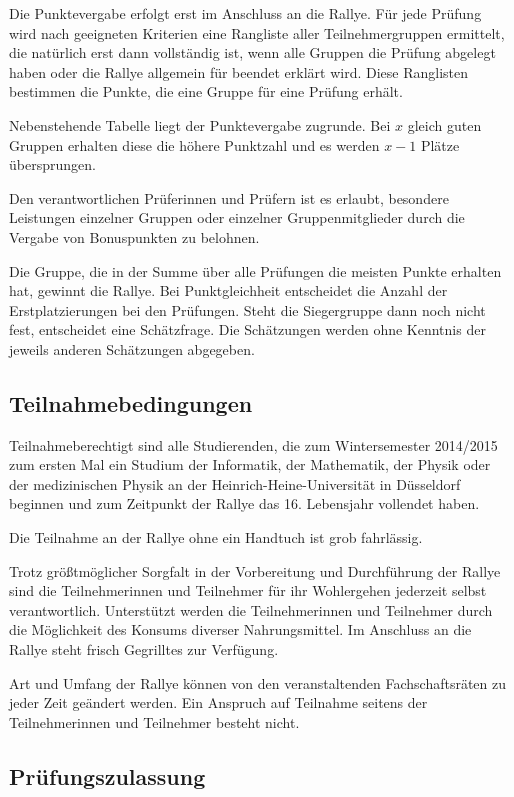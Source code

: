\documentclass[a4paper,10pt]{article}
\begin{document}
Die Punktevergabe erfolgt erst im Anschluss an die Rallye. Für jede
Prüfung wird nach geeigneten Kriterien eine Rangliste aller
Teilnehmergruppen ermittelt, die natürlich erst dann vollständig ist,
wenn alle Gruppen die Prüfung abgelegt haben oder die Rallye allgemein
für beendet erklärt wird. Diese Ranglisten bestimmen die Punkte, die
eine Gruppe für eine Prüfung erhält.

Nebenstehende Tabelle liegt der Punktevergabe zugrunde. Bei $x$ gleich
guten Gruppen erhalten diese die höhere Punktzahl und es werden $x-1$ Plätze
übersprungen.

Den verantwortlichen Prüferinnen und Prüfern ist es erlaubt, besondere
Leistungen einzelner Gruppen oder einzelner Gruppenmitglieder durch die
Vergabe von Bonuspunkten zu belohnen.

Die Gruppe, die in der Summe über alle Prüfungen die meisten Punkte
erhalten hat, gewinnt die Rallye. Bei Punktgleichheit entscheidet die
Anzahl der Erstplatzierungen bei den Prüfungen. Steht die Siegergruppe
dann noch nicht fest, entscheidet eine Schätzfrage. Die Schätzungen
werden ohne Kenntnis der jeweils anderen Schätzungen abgegeben.
\\
\subsection{Teilnahmebedingungen}

Teilnahmeberechtigt sind alle Studierenden, die zum Wintersemester 
2014/2015 zum ersten Mal ein Studium der
Informatik, der Mathematik, der Physik oder der medizinischen Physik an
der Heinrich-Heine-Universität in Düsseldorf beginnen und zum Zeitpunkt
der Rallye das 16. Lebensjahr vollendet haben.

Die Teilnahme an der Rallye ohne ein Handtuch ist grob fahrlässig.

Trotz größtmöglicher Sorgfalt in der Vorbereitung und Durchführung der
Rallye sind die Teilnehmerinnen und Teilnehmer für ihr Wohlergehen 
jederzeit selbst verantwortlich. Unterstützt werden die Teilnehmerinnen
und Teilnehmer durch die Möglichkeit des Konsums diverser Nahrungsmittel. 
Im Anschluss an die Rallye steht frisch Gegrilltes zur Verfügung.

Art und Umfang der Rallye können von den veranstaltenden Fachschaftsräten
zu jeder Zeit geändert werden. Ein Anspruch auf Teilnahme seitens der 
Teilnehmerinnen und Teilnehmer besteht nicht.

\subsection{Prüfungszulassung}
\end{document}
